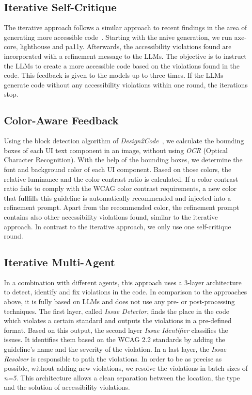 \subsection{Iterative Self-Critique}
The iterative approach follows a similar approach to recent findings in the area
of generating more accessible code~\parencite{suh2025accessiblecode}. Starting 
with the naive generation, we run axe-core, lighthouse and pa11y.
Afterwards, the accessibility violations found are incorporated with a refinement 
message to the LLMs. The objective is to instruct the LLMs to create a more 
accessible code based on the violations found in the code. This feedback 
is given to the models up to three times. If the LLMs 
generate code without any accessibility violations within one round, the 
iterations stop.

\subsection{Color-Aware Feedback}
Using the block detection algorithm of \textit{Design2Code}~\parencite{si2024design2code},
we calculate the bounding boxes of each UI text component in an image, without 
using \textit{OCR} (Optical Character 
Recognition). With the help of the bounding boxes, we determine the font 
and background color of each UI component. Based on those colors,
the relative luminance and the color contrast ratio is calculated. If a 
color contrast ratio fails to comply with the WCAG color contrast requirements, 
a new color that fullfills this guideline is automatically recommended and 
injected into a refinement prompt.\newline
Apart from the recommended color, the refinement prompt contains also 
other accessibility violations found, similar to the 
iterative approach. In contrast to the iterative approach, we only use 
one self-critique round.

\subsection{Iterative Multi-Agent}
In a combination with different agents, this approach uses a 3-layer architecture
to detect, identify and fix violations in the code. In comparison to the 
approaches above, it is fully based on LLMs and does not use any pre- or 
post-processing techniques. \newline
The first layer, called \textit{Issue Detector}, finds the place in the code which 
violates a certain standard and outputs the violations in a pre-defined format.
Based on this output, the second layer \textit{Issue Identifier} classifies the issues. 
It identifies them based on the WCAG 2.2 standards by 
adding the guideline's name and the severity of the violation. In a last 
layer, the \textit{Issue Resolver} is responsible to path the violations. 
In order to be 
as precise as possible, without adding new violations, we resolve the violations 
in batch sizes of \textit{n=5}.\newline
This architecture allows a clean separation between the location, the type and 
the solution of accessibility violations.

